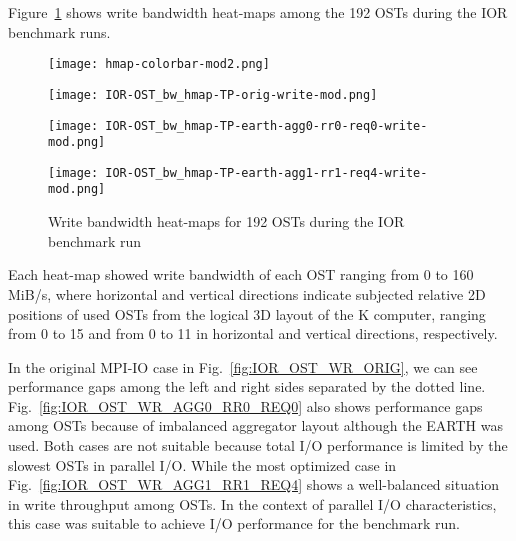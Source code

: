 \documentclass{jhps}
\begin{document}
Figure~\ref{fig:IOR_OST_BW_HMAP_WR} shows write bandwidth heat-maps
among the 192 OSTs during the IOR benchmark runs.
%
\begin{figure}[htb]
\begin{minipage}[t]{0.06\textwidth}
 \texttt{[image: hmap-colorbar-mod2.png]}
\end{minipage}
%
\noindent
\begin{minipage}[t]{0.3\textwidth}
 \centering
 \texttt{[image: IOR-OST\_bw\_hmap-TP-orig-write-mod.png]}
 \label{fig:IOR_OST_WR_ORIG}
\end{minipage}
%
\noindent
\begin{minipage}[t]{0.3\textwidth}
 \centering
 \texttt{[image: IOR-OST\_bw\_hmap-TP-earth-agg0-rr0-req0-write-mod.png]}
 \label{fig:IOR_OST_WR_AGG0_RR0_REQ0}
\end{minipage}
%
\noindent
\begin{minipage}[t]{0.3\textwidth}
 \centering
 \texttt{[image: IOR-OST\_bw\_hmap-TP-earth-agg1-rr1-req4-write-mod.png]}
 \label{fig:IOR_OST_WR_AGG1_RR1_REQ4}
\end{minipage}
%
\caption{Write bandwidth heat-maps for 192 OSTs during the IOR benchmark run}
\label{fig:IOR_OST_BW_HMAP_WR}
\end{figure}
%
Each heat-map showed write bandwidth of each OST ranging from 0 to 160 MiB/s,
where horizontal and vertical directions indicate subjected relative 2D positions
of used OSTs from the logical 3D layout of the K computer,
ranging from 0 to 15 and from 0 to 11 in horizontal and vertical directions, respectively.

In the original MPI-IO case in Fig.~\ref{fig:IOR_OST_WR_ORIG},
we can see performance gaps among the left and right sides separated by
the dotted line.
Fig.~\ref{fig:IOR_OST_WR_AGG0_RR0_REQ0}
also shows performance gaps among OSTs
because of imbalanced aggregator layout although the EARTH was used.
Both cases are not suitable because total I/O performance is limited
by the slowest OSTs in parallel I/O.
While the most optimized case in
Fig.~\ref{fig:IOR_OST_WR_AGG1_RR1_REQ4}
shows a well-balanced situation in write throughput among OSTs.
In the context of parallel I/O characteristics, this case was suitable
to achieve I/O performance for the benchmark run.
\end{document}
